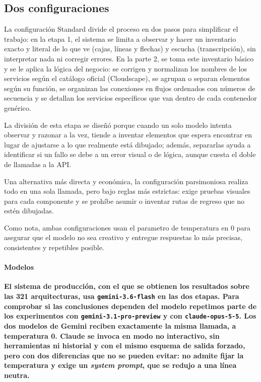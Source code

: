 \documentclass[a4paper, twocolumn, 10pt]{IEEEtran}
\newcommand{\nuevo}[1]{{\bfseries #1}}
\begin{document}
\subsection{Dos configuraciones}
La configuración Standard divide el proceso en dos pasos para simplificar el trabajo: en la etapa 1, el sistema se limita a observar y hacer un inventario exacto y literal de lo que ve (cajas, líneas y flechas) y escucha (transcripción), sin interpretar nada ni corregir errores. En la parte 2, se toma este inventario básico y se le aplica la lógica del negocio: se corrigen y normalizan los nombres de los servicios según el catálogo oficial (Cloudscape), se agrupan o separan elementos según su función, se organizan las conexiones en flujos ordenados con números de secuencia y se detallan los servicios específicos que van dentro de cada contenedor genérico.
 
La división de esta etapa se diseñó porque cuando un solo modelo intenta observar y razonar a la vez, tiende a inventar elementos que espera encontrar en lugar de ajustarse a lo que realmente está dibujado; además, separarlas ayuda a identificar si un fallo se debe a un error visual o de lógica, aunque cuesta el doble de llamadas a la API. 
 
Una alternativa más directa y económica, la configuración parsimoniosa realiza todo en una sola llamada, pero bajo reglas más estrictas: exige pruebas visuales para cada componente y se prohíbe asumir o inventar rutas de regreso que no estén dibujadas.
 
Como nota, ambas configuraciones usan el parametro de temperatura en 0 para asegurar que el modelo no sea creativo y entregue respuestas lo más precisas, consistentes y repetibles posible.

\paragraph{\nuevo{Modelos}} \nuevo{El sistema de producción, con el que se obtienen los
resultados sobre las 321 arquitecturas, usa \texttt{gemini-3.6-flash} en las dos
etapas. Para comprobar si las conclusiones dependen del modelo repetimos parte de
los experimentos con \texttt{gemini-3.1-pro-preview} y con
\texttt{claude-opus-5-5}. Los dos modelos de Gemini reciben exactamente la misma
llamada, a temperatura 0. Claude se invoca en modo no interactivo, sin
herramientas ni historial y con el mismo esquema de salida forzado, pero con dos
diferencias que no se pueden evitar: no admite fijar la temperatura y exige un
\emph{system prompt}, que se redujo a una línea neutra.}
 
\end{document}

